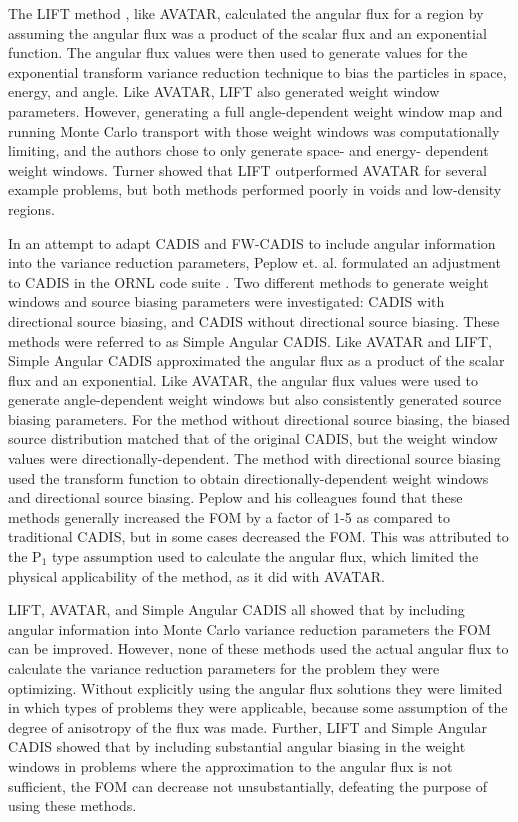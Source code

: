 The LIFT method \cite{turner_automatic_1997, turner_automatic_1997-1}, like
AVATAR, calculated the angular flux for a region by assuming the angular flux
was a product of the scalar flux and an exponential function. The angular flux
values were then used to generate values for the exponential transform variance
reduction
technique to bias the particles in space, energy, and angle. Like AVATAR, LIFT
also generated weight window parameters. However, generating a full
angle-dependent weight window map and running Monte Carlo transport with those
weight windows was computationally limiting, and the authors chose to only
generate space- and energy- dependent weight windows. Turner showed that LIFT
outperformed AVATAR for several example problems, but both methods performed
poorly in voids and low-density regions.

In an attempt to adapt CADIS and FW-CADIS to include angular information into
the variance reduction parameters,
Peplow et. al. formulated an adjustment to CADIS in the ORNL
code suite \cite{peplow_consistent_2012}. Two different
methods to generate weight windows and source biasing parameters
were investigated:
CADIS with directional source biasing, and CADIS without directional source
biasing. These methods were referred to as Simple Angular CADIS. Like AVATAR and
LIFT, Simple Angular CADIS approximated the angular flux as a product of the
scalar flux and an exponential. Like AVATAR, the angular flux values
were used to
generate angle-dependent weight windows but also consistently generated source
biasing parameters. For the method without
directional source biasing, the biased source distribution matched that of the
original CADIS, but the weight window values were directionally-dependent. The
method with directional source biasing used the transform function to obtain
directionally-dependent weight windows and directional source biasing.
Peplow and his colleagues found
that these methods generally increased the FOM by a factor of 1-5 as compared to
traditional CADIS, but in some
cases decreased the FOM. This was attributed to the P$_1$ type assumption used
to calculate the angular flux, which limited the physical applicability of the
method, as it did with AVATAR.

LIFT, AVATAR, and Simple Angular CADIS all showed that by including angular
information into Monte Carlo variance reduction parameters the FOM can be
improved. However, none of these methods used the actual angular flux to
calculate the variance reduction parameters for the problem they were
optimizing. Without explicitly using the angular flux solutions they were
limited in which types of problems they were applicable, because some assumption
of the degree of anisotropy of the flux was made. Further, LIFT and
Simple Angular CADIS showed that by including substantial angular biasing in the
weight windows in problems where the approximation to the angular flux is not
sufficient, the FOM can decrease not unsubstantially, defeating the purpose of using
these methods.

